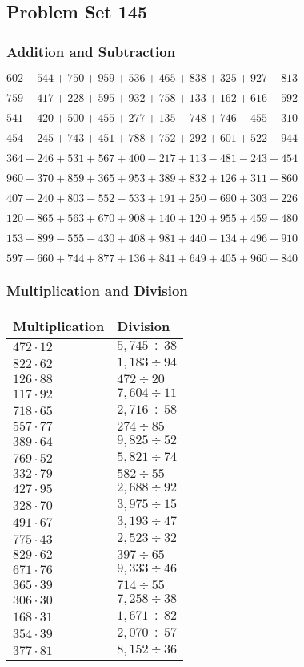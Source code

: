 \hypertarget{problem-set-145}{%
\subsection{Problem Set 145}\label{problem-set-145}}

\hypertarget{addition-and-subtraction}{%
\subsubsection{Addition and
Subtraction}\label{addition-and-subtraction}}

\(602 +544 +750 +959 +536 +465 +838 +325 +927 +813\)

\(759 +417 +228 +595 +932 +758 +133 +162 +616 +592\)

\(541 - 420 +500 +455 +277 +135 - 748 +746 - 455 - 310\)

\(454 +245 +743 +451 +788 +752 +292 +601 +522 +944\)

\(364 - 246 +531 +567 +400 - 217 +113 - 481 - 243 +454\)

\(960 +370 +859 +365 +953 +389 +832 +126 +311 +860\)

\(407 +240 +803 - 552 - 533 +191 +250 - 690 +303 - 226\)

\(120 +865 +563 +670 +908 +140 +120 +955 +459 +480\)

\(153 +899 - 555 - 430 +408 +981 +440 - 134 +496 - 910\)

\(597 +660 +744 +877 +136 +841 +649 +405 +960 +840\)

\hypertarget{multiplication-and-division}{%
\subsubsection{Multiplication and
Division}\label{multiplication-and-division}}

\begin{longtable}[]{@{}ll@{}}
\toprule
Multiplication & Division\tabularnewline
\midrule
\endhead
\(472 \cdot 12\) & \(5,745÷38\)\tabularnewline
\(822 \cdot 62\) & \(1,183÷94\)\tabularnewline
\(126 \cdot 88\) & \(472÷20\)\tabularnewline
\(117 \cdot 92\) & \(7,604÷11\)\tabularnewline
\(718 \cdot 65\) & \(2,716÷58\)\tabularnewline
\(557 \cdot 77\) & \(274÷85\)\tabularnewline
\(389 \cdot 64\) & \(9,825÷52\)\tabularnewline
\(769 \cdot 52\) & \(5,821÷74\)\tabularnewline
\(332 \cdot 79\) & \(582÷55\)\tabularnewline
\(427 \cdot 95\) & \(2,688÷92\)\tabularnewline
\(328 \cdot 70\) & \(3,975÷15\)\tabularnewline
\(491 \cdot 67\) & \(3,193÷47\)\tabularnewline
\(775 \cdot 43\) & \(2,523÷32\)\tabularnewline
\(829 \cdot 62\) & \(397÷65\)\tabularnewline
\(671 \cdot 76\) & \(9,333÷46\)\tabularnewline
\(365 \cdot 39\) & \(714÷55\)\tabularnewline
\(306 \cdot 30\) & \(7,258÷38\)\tabularnewline
\(168 \cdot 31\) & \(1,671÷82\)\tabularnewline
\(354 \cdot 39\) & \(2,070÷57\)\tabularnewline
\(377 \cdot 81\) & \(8,152÷36\)\tabularnewline
\bottomrule
\end{longtable}
